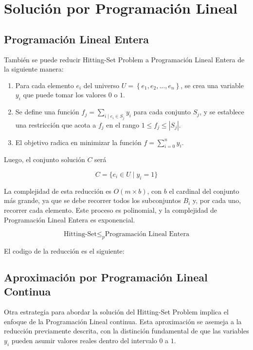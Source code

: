 \section{Solución por Programación Lineal}

\subsection{Programación Lineal Entera}

También se puede reducir Hitting-Set Problem a Programación Lineal Entera de la siguiente manera:

\begin{enumerate}

    \item Para cada elemento $e_i$ del universo $U=\left\{e_1,e_2,\dots,e_{n}\right\}$, se crea una variable $y_{i}$ que puede tomar los valores $0$ o $1$.
    
    \item Se define una función \(f_{j} = \sum_{i\mid e_i \in S_j} y_i\) para cada conjunto \(S_{j}\), y se establece una restricción que acota a \(f_{j}\) en el rango \(1 \leq f_{j} \leq |S_{j}|\).

    \item  El objetivo radica en minimizar la función $f=\sum_{i=0}^{n}y_{i}$.

\end{enumerate}

Luego, el conjunto solución $C$ será

\[
    C = \{e_i \in U \mid y_{i} = 1\}
\]

La complejidad de esta reducción es $O(m \times b)$, con $b$ el cardinal del conjunto más grande, ya que se debe recorrer todos los subconjuntos $B_i$ y, por cada uno, recorrer cada elemento. Este proceso es polinomial, y la complejidad de Programación Lineal Entera es exponencial.

\[\text{Hitting-Set} \leq _{p} \text{Programación Lineal Entera}\]

El codigo de la reducción es el siguiente:



\subsection{Aproximación por Programación Lineal Continua}

Otra estrategia para abordar la solución del Hitting-Set Problem implica el enfoque de la Programación Lineal continua. Esta aproximación se asemeja a la reducción previamente descrita, con la distinción fundamental de que las variables 
$y_i$ pueden asumir valores reales dentro del intervalo $0$ a $1$.

